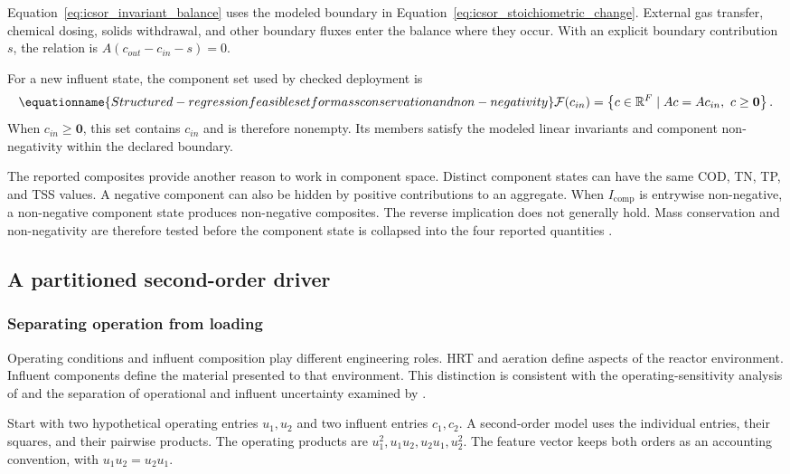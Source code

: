 Equation~\eqref{eq:icsor_invariant_balance} uses the modeled boundary in Equation~\eqref{eq:icsor_stoichiometric_change}. External gas transfer, chemical dosing, solids withdrawal, and other boundary fluxes enter the balance where they occur. With an explicit boundary contribution \(s\), the relation is \(A(c_{out}-c_{in}-s)=0\).

For a new influent state, the component set used by checked deployment is
\begin{equation}
\equationname{Structured-regression feasible set for mass conservation and non-negativity}
\label{eq:icsor_feasible_set}
\mathcal{F}(c_{in})=
\left\{c\in\mathbb{R}^{F}\mid Ac=Ac_{in},\ c\geq\mathbf{0}\right\}.
\end{equation}
When \(c_{in}\geq\mathbf{0}\), this set contains \(c_{in}\) and is therefore nonempty. Its members satisfy the modeled linear invariants and component non-negativity within the declared boundary.

The reported composites provide another reason to work in component space. Distinct component states can have the same COD, TN, TP, and TSS values. A negative component can also be hidden by positive contributions to an aggregate. When \(I_{\mathrm{comp}}\) is entrywise non-negative, a non-negative component state produces non-negative composites. The reverse implication does not generally hold. Mass conservation and non-negativity are therefore tested before the component state is collapsed into the four reported quantities \citep{Henze2006,Selerio2026}.

\subsection{A partitioned second-order driver}

\subsubsection{Separating operation from loading}

Operating conditions and influent composition play different engineering roles. HRT and aeration define aspects of the reactor environment. Influent components define the material presented to that environment. This distinction is consistent with the operating-sensitivity analysis of \citet{Araujo2013} and the separation of operational and influent uncertainty examined by \citet{Machado2014}.

Start with two hypothetical operating entries \(u_1,u_2\) and two influent entries \(c_1,c_2\). A second-order model uses the individual entries, their squares, and their pairwise products. The operating products are \(u_1^2,u_1u_2,u_2u_1,u_2^2\). The feature vector keeps both orders as an accounting convention, with \(u_1u_2=u_2u_1\).

